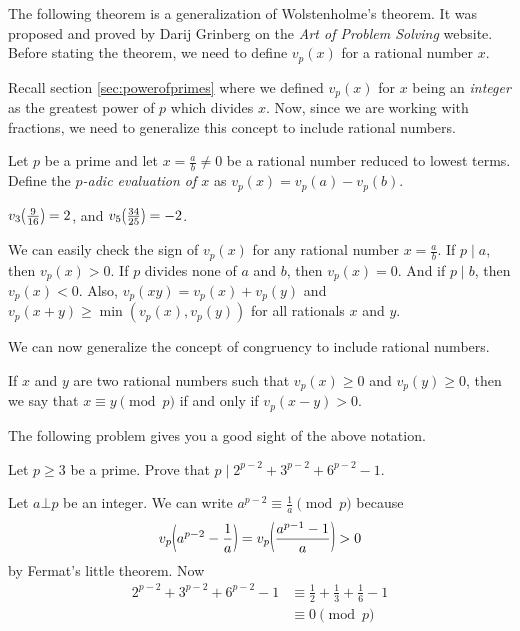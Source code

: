 \documentclass{subfile}
\begin{document}
	The following theorem is a generalization of Wolstenholme's theorem. It was proposed and proved by Darij Grinberg on the \textit{Art of Problem Solving} website. Before stating the theorem, we need to define $v_p(x)$ for a rational number $x$.

	Recall section \eqref{sec:powerofprimes} where we defined $v_p(x)$ for $x$ being an \textit{integer} as the greatest power of $p$ which divides $x$. Now, since we are working with fractions, we need to generalize this concept to include rational numbers.

	\begin{definition}
		Let $p$ be a prime and let $x = \frac{a}{b} \neq 0$ be a rational number reduced to lowest terms. Define the \textit{$p$-adic evaluation of $x$} as $v_p(x) = v_p(a)-v_p(b)$.
	\end{definition}

	\begin{example}
		$v_{3}\func{}{\frac{9}{16}}= 2$, and $v_{5}\func{}{\frac{34}{25}} = -2$.
	\end{example}

	\begin{note}
		We can easily check the sign of $v_p(x)$ for any rational number $x=\frac{a}{b}$. If $p\mid a$, then $v_p(x)>0$. If $p$ divides none of $a$ and $b$, then $v_p(x)=0$. And if $p\mid b$, then $v_p(x)<0$. Also,  $ v_{p}\left(xy\right) = v_{p}\left(x\right) + v_{p}\left(y\right)$ and $ v_{p}\left(x + y\right)\geq\min\left(v_{p}\left(x\right),v_{p}\left(y\right)\right)$ for all rationals $x$ and $y$.
	\end{note}

	We can now generalize the concept of congruency to include rational numbers.
	\begin{definition}
		If $x$ and $y$ are two rational numbers such that $ v_{p}\left(x\right)\geq 0$ and $ v_{p}\left(y\right)\geq 0$, then we say that $ x\equiv y\pmod p$ if and only if $ v_{p}\left(x - y\right) > 0$.
	\end{definition}

	The following problem gives you a good sight of the above notation.

	\begin{problem}
		Let $p \geq 3$ be a prime. Prove that $p\mid 2^{p-2}+3^{p-2}+6^{p-2}-1$.
	\end{problem}

	\begin{solution}
		Let $a \bot p$ be an integer. We can write $a^{p-2} \equiv \frac{1}{a} \pmod p$ because
			\begin{align*}
				v_{p}\func{}{a^{p-2}- \frac{1}{a}}=v_{p}\func{}{\frac{a^{p-1}-1}{a}}>0
			\end{align*}
		by Fermat's little theorem. Now
		\begin{align*}
		2^{p-2}+3^{p-2}+6^{p-2}-1
			& \equiv \frac{1}{2}+\frac{1}{3}+\frac{1}{6}-1\\
			& \equiv 0 \pmod p
		\end{align*}
	\end{solution}
\end{document}
